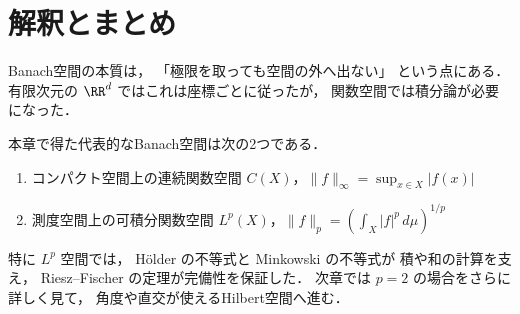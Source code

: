 \section{解釈とまとめ}

Banach空間の本質は，
「極限を取っても空間の外へ出ない」
という点にある．
有限次元の $\RR^d$ ではこれは座標ごとに従ったが，
関数空間では積分論が必要になった．

本章で得た代表的なBanach空間は次の2つである．
\begin{enumerate}
    \item コンパクト空間上の連続関数空間
    $C(X)$，$\|f\|_\infty=\sup_{x\in X}|f(x)|$
    \item 測度空間上の可積分関数空間
    $L^p(X)$，$\|f\|_p=\left(\int_X |f|^p\,d\mu\right)^{1/p}$
\end{enumerate}

特に $L^p$ 空間では，
Hölder の不等式と Minkowski の不等式が
積や和の計算を支え，
Riesz--Fischer の定理が完備性を保証した．
次章では $p=2$ の場合をさらに詳しく見て，
角度や直交が使えるHilbert空間へ進む．
